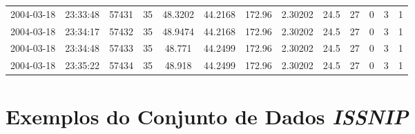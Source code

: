 \documentclass[cic,tc]{iiufrgs}
\begin{document}
\begin{table}[h]
\begin{adjustwidth}{-0.7in}{-0.7in}
\begin{center}
{\begin{tabular}{ccccccccccccc}
    2004-03-18 & 23:33:48 & 57431 & 35 & 48.3202 & 44.2168 & 172.96 & 2.30202 & 24.5 & 27 & 0 & 3 & 1 \\
    2004-03-18 & 23:34:17 & 57432 & 35 & 48.9474 & 44.2168 & 172.96 & 2.30202 & 24.5 & 27 & 0 & 3 & 1 \\
    2004-03-18 & 23:34:48 & 57433 & 35 & 48.771 & 44.2499 & 172.96 & 2.30202 & 24.5 & 27 & 0 & 3 & 1 \\
    2004-03-18 & 23:35:22 & 57434 & 35 & 48.918 & 44.2499 & 172.96 & 2.30202 & 24.5 & 27 & 0 & 3 & 1 \\
    \hline
    \end{tabular}}
    \end{center}
    \end{adjustwidth}
    \bigskip
\end{table}

\chapter{Exemplos do Conjunto de Dados \textit{ISSNIP}}
\label{app_issnip}
\end{document}
